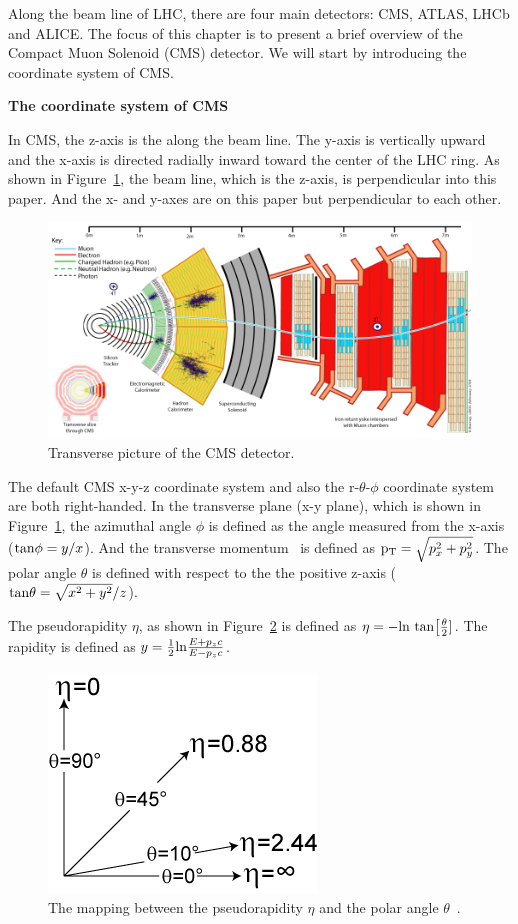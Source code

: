 Along the beam line of LHC, there are four main detectors: CMS, ATLAS, LHCb and ALICE.
The focus of this chapter is to present a brief overview of the Compact Muon Solenoid (CMS) detector. 
We will start by introducing the coordinate system of CMS.  

{\bf The coordinate system of CMS}

In CMS, the z-axis is the along the beam line. The y-axis is vertically upward and the x-axis is directed 
radially inward toward the center of the LHC ring. As shown in Figure~\ref{fig:CMS_Slice}, the beam line, which is the z-axis, is perpendicular into this paper. And the x- and y-axes are on this paper but perpendicular to each other. 

\begin{figure}
\centering
\includegraphics[width=.9\textwidth]{figures/CMS_Slice.png}
\caption{Transverse picture of the CMS detector.}
\label{fig:CMS_Slice}
\end{figure}


The default CMS x-y-z coordinate system and also the r-$\theta$-$\phi$ coordinate system are both right-handed. In the transverse plane (x-y plane), which is shown in Figure~\ref{fig:CMS_Slice},  the azimuthal angle 
$\phi$ is defined as the angle measured from the x-axis (${\rm tan}\phi = y/x$). And the transverse momentum \pt~is defined as $\mathrm{p_{T}} = \sqrt{p_x^2 +p_y^2}$.  The polar angle $\theta$ is defined with respect to the the positive z-axis (${\rm tan}\theta = \sqrt{x^2+y^2}/z$).


The pseudorapidity $\eta$, as shown in Figure~\ref{fig:pseudo} is defined as $\eta = -{\rm ln}~{\rm tan}\big[\frac{\theta}{2}]$. The rapidity is defined as $y = \frac{1}{2} {\rm ln} \frac{E+p_zc}{E-p_zc}$.  

\begin{figure}[!htbp]
\centering
\includegraphics[width=.5\textwidth]{figures/pseudorapidity.png}
\caption{The mapping between the pseudorapidity $\eta$ and the polar angle $\theta$~\cite{wiki2}.}
\label{fig:pseudo}
\end{figure}


